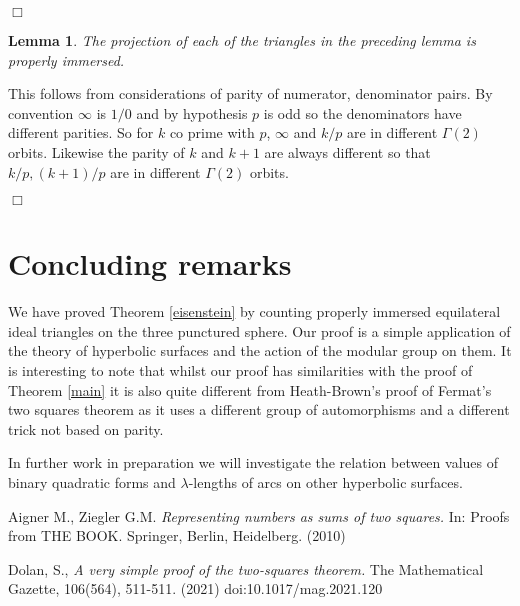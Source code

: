 \documentclass[12pt]{amsart}
\theoremstyle{plain}
\newtheorem{lemma}{Lemma}[section]
\theoremstyle{definition}
\begin{document}
\hfill $\Box$


\begin{lemma}\label{proper}
The projection of each of the triangles in the preceding lemma
is properly immersed.
\end{lemma}

\proof This follows from considerations of parity of numerator, denominator pairs.
By convention $\infty$ is $1/0$ and 
by hypothesis $p$ is odd so the denominators have different parities. So for $k$ co prime with $p$, 
$\infty$ and $k/p$ are in different $\Gamma(2)$ orbits.
Likewise the parity of $k$ and $k+1$ are always different
so that $k/p, (k+1)/p$ are in different $\Gamma(2)$ orbits.

\hfill $\Box$


\section{Concluding remarks}

We have proved Theorem \ref{eisenstein} by counting properly
immersed equilateral ideal triangles on the three punctured sphere.
Our proof is a simple application of the theory of hyperbolic surfaces and the action of the modular group on them.
It is interesting to note that whilst our proof has similarities
with the proof of Theorem \ref{main} it is also quite different from
Heath-Brown's proof of Fermat's two squares theorem \cite{heath} as
it uses a different group of automorphisms and a different trick not
based on parity.

In further work in preparation we will investigate the relation  between values of
binary quadratic forms and $\lambda$-lengths of arcs
on other hyperbolic surfaces.
 




Aigner M., Ziegler G.M.  
\textit{Representing numbers as sums of two squares.} In: Proofs from THE BOOK. Springer, Berlin, Heidelberg. (2010)


Dolan, S., 
\textit{A very simple proof of the two-squares theorem.}
The Mathematical Gazette, 106(564), 511-511. (2021) doi:10.1017/mag.2021.120
%
%
\end{document}
